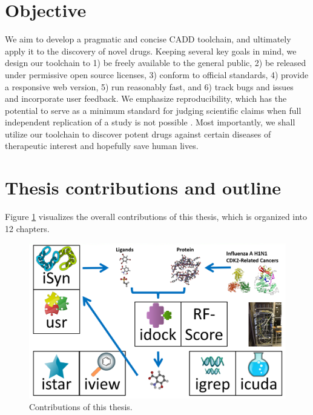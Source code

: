 \section{Objective}

We aim to develop a pragmatic and concise CADD toolchain, and ultimately apply it to the discovery of novel drugs. Keeping several key goals in mind, we design our toolchain to 1) be freely available to the general public, 2) be released under permissive open source licenses, 3) conform to official standards, 4) provide a responsive web version, 5) run reasonably fast, and 6) track bugs and issues and incorporate user feedback. We emphasize reproducibility, which has the potential to serve as a minimum standard for judging scientific claims when full independent replication of a study is not possible \citep{965}. Most importantly, we shall utilize our toolchain to discover potent drugs against certain diseases of therapeutic interest and hopefully save human lives.

\section{Thesis contributions and outline}

Figure \ref{thesis:contributions} visualizes the overall contributions of this thesis, which is organized into 12 chapters.

\begin{figure}
\begin{center}
\includegraphics[width=\linewidth]{Contributions.png}
\end{center}
\caption{Contributions of this thesis.}
\label{thesis:contributions}
\end{figure}


